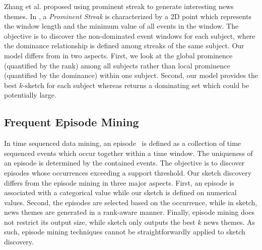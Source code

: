 Zhang et al.\cite{zhang2014discovering} proposed using prominent streak to generate interesting news themes.
In \cite{zhang2014discovering}, a \emph{Prominent Streak} is characterized by a 2D point which represents the window length and the minimum value of all events in the window. The objective is to discover the non-dominated event windows for each subject, where the dominance relationship is defined among streaks of the same subject. Our model differs from \cite{zhang2014discovering} in two aspects. First, we look at the global prominence (quantified by the rank) among all subjects rather than local prominence (quantified by the dominance) within one subject. Second, our model provides the best $k$-sketch for each subject whereas \cite{zhang2014discovering} returns a dominating set which could be potentially large. 
 
\subsection{Frequent Episode Mining}
In time sequenced data mining, an episode~\cite{mannila1997discepisodes,
zhou2010serialepisodes, tatti2012strictepisodes, laxman2007nonoverlapepisodes} is 
defined as a collection of time sequenced events which occur together within a time window. The uniqueness of an episode is determined by the contained events. The objective is to discover episodes whose 
occurrences exceeding a support threshold. 
Our sketch discovery differs from the episode mining in three major aspects. First, an episode is associated with a categorical value while our sketch is defined on numerical values. Second, the episodes are selected based on the occurrence, while in sketch, news themes are generated in a rank-aware manner. Finally, episode mining does not restrict its output size, while sketch only outputs the best $k$ news themes. As such, episode mining techniques cannot be straightforwardly applied to sketch discovery.



